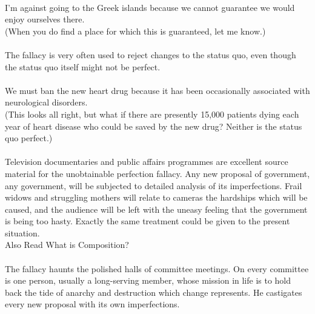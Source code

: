 \documentclass[a4paper,12pt,single,pdftex]{scrartcl}
\begin{document}
    \\

    
      I'm against going to the Greek islands because we cannot guarantee we would enjoy ourselves there.
    \\

    
      (When you do find a place for which this is guaranteed, let me know.)
    \\

    
      
    \\

    
      The fallacy is very often used to reject changes to the status quo, even though the status quo itself might not be perfect.
    \\

    
      
    \\

    
      We must ban the new heart drug because it has been occasionally associated with neurological disorders.
    \\

    
      (This looks all right, but what if there are presently 15,000 patients dying each year of heart disease who could be saved by the new drug? Neither is the status quo perfect.)
    \\

    
      
    \\

    
      Television documentaries and public affairs programmes are excellent source material for the unobtainable perfection fallacy. Any new proposal of government, any government, will be subjected to detailed analysis of its imperfections. Frail widows and struggling mothers will relate to cameras the hardships which will be caused, and the audience will be left with the uneasy feeling that the government is being too hasty. Exactly the same treatment could be given to the present situation.
    \\

    
      Also Read  What is Composition?
    \\

    
      
    \\

    
      The fallacy haunts the polished halls of committee meetings. On every committee is one person, usually a long-serving member, whose mission in life is to hold back the tide of anarchy and destruction which change represents. He castigates every new proposal with its own imperfections.
    \\
\end{document}
